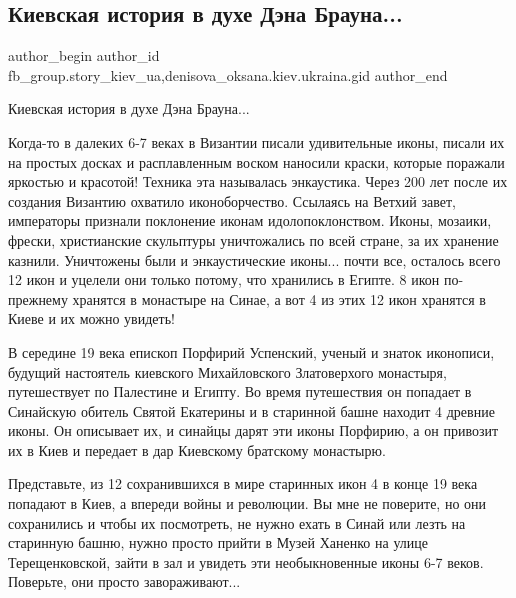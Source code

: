  
 
 
 
 
 
\subsection{Киевская история в духе Дэна Брауна...}
\label{sec:27_10_2021.fb.fb_group.story_kiev_ua.1.ikony_vizantia}
 
\ifcmt
 author_begin
   author_id fb_group.story_kiev_ua,denisova_oksana.kiev.ukraina.gid
 author_end
\fi

Киевская история в духе Дэна Брауна... 

Когда-то в далеких 6-7 веках в Византии писали удивительные иконы, писали их на
простых досках и расплавленным воском наносили краски, которые поражали
яркостью и красотой! Техника эта называлась энкаустика. Через 200 лет после их
создания Византию охватило иконоборчество. Ссылаясь на Ветхий завет, императоры
признали поклонение иконам идолопоклонством. Иконы, мозаики, фрески,
христианские скульптуры уничтожались по всей стране, за их хранение казнили.
Уничтожены были и энкаустические иконы... почти все, осталось всего 12 икон и
уцелели  они только потому, что хранились в Египте. 8 икон по-прежнему хранятся
в монастыре на Синае, а вот 4 из этих 12 икон хранятся в Киеве и их можно
увидеть!


В середине 19 века епископ Порфирий Успенский, ученый и знаток  иконописи,
будущий настоятель киевского Михайловского Златоверхого монастыря, путешествует
по Палестине и Египту. Во время путешествия он  попадает в Синайскую обитель
Святой Екатерины и в старинной башне находит 4 древние иконы. Он описывает их,
и синайцы дарят эти иконы Порфирию, а он привозит их в Киев и передает в дар
Киевскому братскому монастырю. 

\begin{multicols}{2} %
\setlength{\parindent}{0pt}
\end{multicols} %

Представьте, из 12 сохранившихся в мире старинных икон  4 в конце 19 века
попадают в Киев, а впереди войны и революции. Вы мне не поверите, но они
сохранились и чтобы их посмотреть, не нужно ехать в Синай или лезть на
старинную башню, нужно просто прийти в Музей Ханенко на улице Терещенковской,
зайти в зал и увидеть эти  необыкновенные иконы 6-7 веков. Поверьте, они просто
завораживают...

